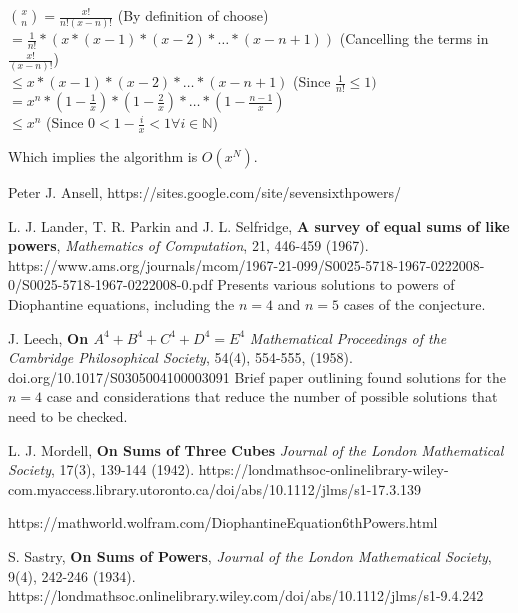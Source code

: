 \documentclass{article}
\begin{document}
\begin{flushleft}
\begin{tabbing}
    ${x \choose n} = \frac{x!}{n!(x - n)!}$ (By definition of choose) \\
    \hspace{.19in} $= \frac{1}{n!} * (x * (x - 1) * (x - 2) * \ldots * (x - n + 1))$ (Cancelling the terms in $\frac{x!}{(x - n)!}$) \\
    \hspace{.19in} $\leq x * (x - 1) * (x - 2) * \ldots * (x - n + 1)$ (Since $\frac{1}{n!} \leq 1)$ \\
    \hspace{.19in} $= x^n * (1 - \frac{1}{x}) * (1 - \frac{2}{x}) * \ldots * (1 - \frac{n - 1}{x})$ \\
    \hspace{.19in} $\leq x^n$ (Since $0 < 1 - \frac{i}{x} < 1 \forall i \in \mathbb{N}$)        
\end{tabbing}

Which implies the algorithm is $O(x^N)$.




\begin{thebibliography}{9}

Peter J. Ansell, https://sites.google.com/site/sevensixthpowers/

L. J. Lander, T. R. Parkin and J. L. Selfridge,
       {\bf A survey of equal sums of like powers}, 
        \textit{Mathematics of Computation}, 21, 446-459 (1967). 
        https://www.ams.org/journals/mcom/1967-21-099/S0025-5718-1967-0222008-0/S0025-5718-1967-0222008-0.pdf 
        \subitem Presents various solutions to powers of Diophantine equations, including the $n=4$ and $n=5$ cases of the conjecture. 

J. Leech, {\bf On $A^4 + B^4 + C^4 + D^4 = E^4$}
    \textit{Mathematical Proceedings of the Cambridge Philosophical Society}, 54(4), 554-555, (1958).
        doi.org/10.1017/S0305004100003091
        \subitem Brief paper outlining found solutions for the $n=4$ case and considerations that reduce the number of possible solutions that need to be checked.

L. J. Mordell, {\bf On Sums of Three Cubes}
\textit{Journal of the London Mathematical Society}, 17(3), 139-144 (1942). 
https://londmathsoc-onlinelibrary-wiley-com.myaccess.library.utoronto.ca/doi/abs/10.1112/jlms/s1-17.3.139


https://mathworld.wolfram.com/DiophantineEquation6thPowers.html

S. Sastry, 
{\bf On Sums of Powers}, 
\textit{Journal of the London Mathematical Society}, 9(4), 242-246 (1934). 
https://londmathsoc.onlinelibrary.wiley.com/doi/abs/10.1112/jlms/s1-9.4.242

\end{thebibliography}

\end{flushleft}
\end{document}
